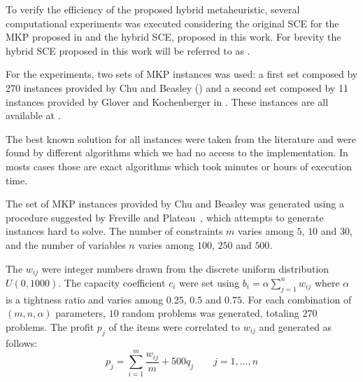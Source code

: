 To verify the efficiency of the proposed hybrid metaheuristic, several computational
experiments was executed considering the original SCE for the MKP proposed in
\cite{baroni2015shuffled} and the hybrid SCE, proposed in this work.
For brevity the hybrid SCE proposed in this work will be referred to as \scecore.

For the experiments, two sets of MKP instances was used:
a first set composed by 270 instances provided by Chu and Beasley (\cite{Chu-Beasley-1998})
and a second set composed by 11 instances provided by Glover and Kochenberger in
\cite{glover1996critical}.
These instances are all available at \cite{ORLibrary}.

The best known solution for all instances were taken from the literature and
were found by different algorithms which we had no access to the implementation.
In mosts cases those are exact algorithms which took
minutes or hours of execution time.

The set of MKP instances provided by Chu and Beasley was generated using a
procedure suggested by Freville and Plateau~\cite{freville1994efficient}, which
attempts to generate instances hard to solve.
The number of constraints $m$ varies among $5$, $10$ and $30$, and the number
of variables $n$ varies among $100$, $250$ and $500$.

The $w_{ij}$ were integer numbers drawn from the discrete uniform distribution
$U(0, 1000)$.
The capacity coefficient $c_i$ were set using
$b_i = \alpha\sum_{j=1}^{n} w_{ij}$ where $\alpha$ is a tightness ratio and
varies among $0.25$, $0.5$ and $0.75$.
For each combination of $(m,n,\alpha)$ parameters, $10$ random problems was generated,
totaling $270$ problems.
The profit $p_j$ of the items were correlated to $w_{ij}$ and generated as follows:
\begin{equation}
  p_j = \sum_{i=1}^m \frac{w_{ij}}{m} + 500q_j \qquad j = 1, \ldots, n
\end{equation}



